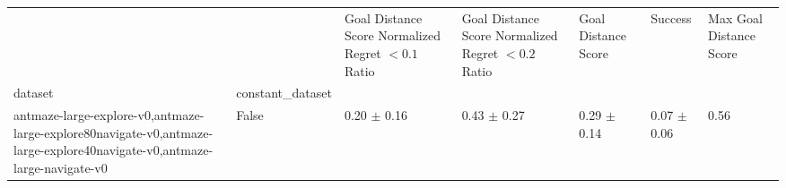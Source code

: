 \begin{tabular}{lllllll}
\toprule
 &  & Goal Distance Score Normalized Regret $< 0.1$ Ratio & Goal Distance Score Normalized Regret $< 0.2$ Ratio & Goal Distance Score & Success & Max Goal Distance Score \\
dataset & constant_dataset &  &  &  &  &  \\
\midrule
antmaze-large-explore-v0,antmaze-large-explore80navigate-v0,antmaze-large-explore40navigate-v0,antmaze-large-navigate-v0 & False & 0.20 $\pm$ 0.16 & 0.43 $\pm$ 0.27 & 0.29 $\pm$ 0.14 & 0.07 $\pm$ 0.06 & 0.56 \\
\cline{1-7}
\bottomrule
\end{tabular}
